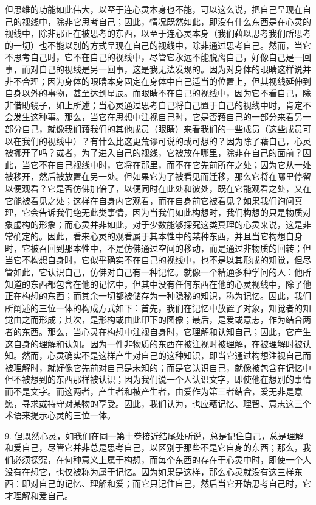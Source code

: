 但思维的功能如此伟大，以至于连心灵本身也不能，可以这么说，把自己呈现在自己的视线中，除非它思考自己；因此，情况既然如此，即没有什么东西是在心灵的视线中，除非那正在被思考的东西，以至于连心灵本身（我们藉以思考我们所思考的一切）也不能以别的方式呈现在自己的视线中，除非通过思考自己。然而，当它不思考自己时，它不在自己的视线中，尽管它永远不能脱离自己，好像自己是一回事，而对自己的视线是另一回事，这是我无法发现的。因为对身体的眼睛这样说并非不合理；因为身体的眼睛本身固定在身体中自己适当的位置上，但其视线延伸到自身以外的事物，甚至达到星辰。而眼睛不在自己的视线中，因为它不看自己，除非借助镜子，如上所述；当心灵通过思考自己将自己置于自己的视线中时，肯定不会发生这种事。那么，当它在思想中注视自己时，它是否藉自己的一部分来看另一部分自己，就像我们藉我们的其他成员（眼睛）来看我们的一些成员（这些成员可以在我们的视线中）？有什么比这更荒谬可说的或可想的？因为除了藉自己，心灵被挪开了吗？或者，为了进入自己的视线，它被放在哪里，除非在自己的面前？因此，当它不在自己视线中时，它将在那里，而不在它先前所在之处；因为它从一处被移开，然后被放置在另一处。但如果它为了被看见而迁移，那么它将在哪里停留以便观看？它是否仿佛加倍了，以便同时在此处和彼处，既在它能观看之处，又在它能被看见之处；这样在自身内它观看，而在自身前它被看见？如果我们询问真理，它会告诉我们绝无此类事情，因为当我们如此构想时，我们构想的只是物质对象虚构的形象；而心灵并非如此，对于少数能够探究这类真理的心灵来说，这是非常确定的。因此，看来心灵的观看属于其本性中的某种东西，并且当它构想自身时，它被召回到那本性中，不是仿佛通过空间的移动，而是通过非物质的回转；但当它不构想自身时，它似乎确实不在自己的视线中，也不是以其形成的知觉，但尽管如此，它认识自己，仿佛对自己有一种记忆。就像一个精通多种学问的人：他所知道的东西都包含在他的记忆中，但其中没有任何东西在他的心灵视线中，除了他正在构想的东西；而其余一切都被储存为一种隐秘的知识，称为记忆。因此，我们所阐述的三位一体的构成方式如下：首先，我们在记忆中放置了对象，知觉者的知觉由之而形成；其次，是形构或由此印下的图像；最后，是爱或意志，作为结合两者的东西。那么，当心灵在构想中注视自身时，它理解和认知自己；因此，它产生这自身的理解和认知。因为一件非物质的东西在被注视时被理解，在被理解时被认知。然而，心灵确实不是这样产生对自己的这种知识，即当它通过构想注视自己而被理解时，就好像它先前对自己是未知的；而是它认识自己，就像被包含在记忆中但不被想到的东西那样被认识；因为我们说一个人认识文字，即使他在想别的事情而不是文字。而这两者，产生者和被产生者，由爱作为第三者结合，爱无非是意愿，寻求或持守对某物的享受。因此，我们认为，也应藉记忆、理智、意志这三个术语来提示心灵的三位一体。\par

9. 但既然心灵，如我们在同一第十卷接近结尾处所说，总是记住自己，总是理解和爱自己，尽管它并非总是思考自己，以区别于那些不是它自身的东西；那么，我们必须探究，在何种意义上属于构想，而每个东西的存在于心灵中时，即使一个人没有在想它，也仅被称为属于记忆。因为如果是这样，那么心灵就没有这三样东西：即对自己的记忆、理解和爱；而它只记住自己，然后当它开始思考自己时，它才理解和爱自己。\par

